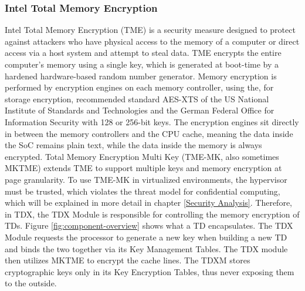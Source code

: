 \subsubsection{Intel Total Memory Encryption}
\label{Memory Encrpytion}
Intel Total Memory Encryption (TME) is a security measure designed to protect against attackers who have physical access to the memory of a computer or direct access via a host system and attempt to steal data. TME encrypts the entire computer's memory using a single key, which is generated at boot-time by a hardened hardware-based random number generator. Memory encryption is performed by encryption engines on each memory controller, using the, for storage encryption, recommended standard AES-XTS of the US National Institute of Standards and Technologies \cite{morris_dworkin_recommendation_2015} and the German Federal Office for Information Security with 128 or 256-bit keys\cite[~p. 24]{bundesamt_fur_sicherheit_in_der_informationstechnik_cryptographic_2023}. The encryption engines sit directly in between the memory controllers and the CPU cache, meaning the data inside the SoC remains plain text, while the data inside the memory is always encrypted. Total Memory Encryption Multi Key (TME-MK, also sometimes MKTME) extends TME to support multiple keys and memory encryption at page granularity. To use TME-MK in virtualized environments, the hypervisor must be trusted, which violates the threat model for confidential computing, which will be explained in more detail in chapter \ref{Security Analysis}. Therefore, in TDX, the TDX Module is responsible for controlling the memory encryption of TDs. Figure \ref{fig:component-overview} shows what a TD encapsulates. The TDX Module requests the processor to generate a new key when building a new TD and binds the two together via its Key Management Tables. The TDX module then utilizes MKTME to encrypt the cache lines. The TDXM stores cryptographic keys only in its Key Encryption Tables, thus never exposing them to the outside\cite{cheng_intel_2023}. 

